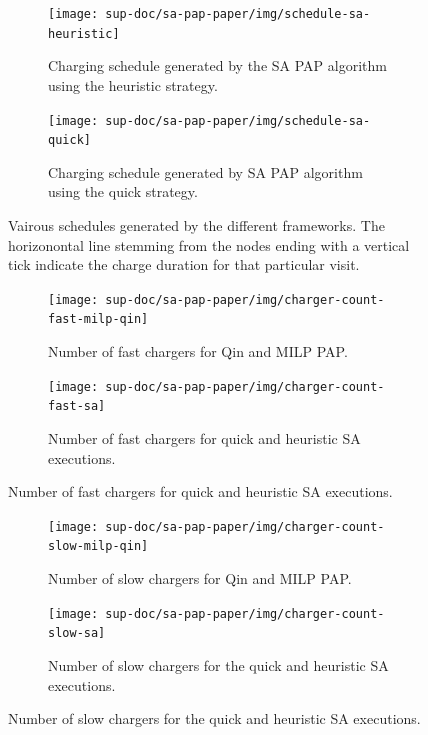 \documentclass[ee,thesis]{usuthesis}
\begin{document}
\begin{figure} \ContinuedFloat
  \centering

  \begin{subfigure}[t]{\textwidth}
    \centering \texttt{[image: sup-doc/sa-pap-paper/img/schedule-sa-heuristic]}
    \caption{Charging schedule generated by the SA PAP algorithm using the heuristic strategy.}
    \label{subfig:schedule-heuristic-sa}
  \end{subfigure}

  \hfill

  \begin{subfigure}[t]{\textwidth}
    \centering \texttt{[image: sup-doc/sa-pap-paper/img/schedule-sa-quick]}
    \caption{Charging schedule generated by SA PAP algorithm using the quick strategy.}
    \label{subfig:schedule-quick-sa}
  \end{subfigure}
  \caption{Vairous schedules generated by the different frameworks. The horizonontal line stemming from the nodes ending with a vertical tick indicate the charge duration for that particular visit.}
  \label{fig:schedule}
\end{figure}

\begin{figure}
    \begin{subfigure}[t]{\textwidth}
    \centering
        \texttt{[image: sup-doc/sa-pap-paper/img/charger-count-fast-milp-qin]}
        \caption{Number of fast chargers for Qin and MILP PAP.}
        \label{subfig:fast-charger-usage-milp-qinn}
    \end{subfigure}

    \begin{subfigure}[t]{\textwidth}
    \centering
        \texttt{[image: sup-doc/sa-pap-paper/img/charger-count-fast-sa]}
        \caption{Number of fast chargers for quick and heuristic SA executions.}
        \label{subfig:fast-charger-usage-sa}
    \end{subfigure}
\end{figure}

\begin{figure}
    \begin{subfigure}[t]{\textwidth}
    \centering
        \texttt{[image: sup-doc/sa-pap-paper/img/charger-count-slow-milp-qin]}
        \caption{Number of slow chargers for Qin and MILP PAP.}
        \label{subfig:slow-charger-usage-milp-qinn}
    \end{subfigure}
    \begin{subfigure}[t]{\textwidth}
    \centering
        \texttt{[image: sup-doc/sa-pap-paper/img/charger-count-slow-sa]}
        \caption{Number of slow chargers for the quick and heuristic SA executions.}
        \label{subfig:slow-charger-usage-sa}
    \end{subfigure}
\end{figure}
\end{document}
